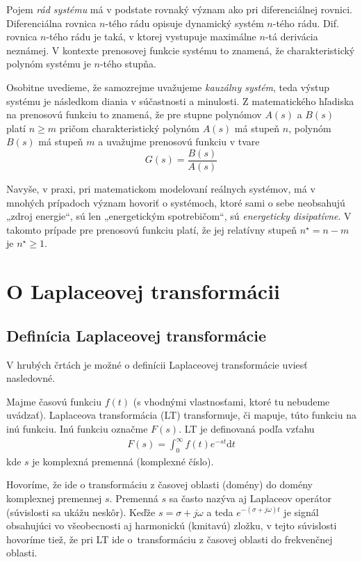 \documentclass[a4paper, 10pt, ]{article}
\begin{document}
Pojem \emph{rád systému} má v podstate rovnaký význam ako pri diferenciálnej rovnici. Diferenciálna rovnica $n$-tého rádu opisuje dynamický systém $n$-tého rádu. Dif. rovnica $n$-tého rádu je taká, v ktorej vystupuje maximálne $n$-tá derivácia neznámej. V kontexte prenosovej funkcie systému to znamená, že charakteristický polynóm systému je $n$-tého stupňa.

Osobitne uvedieme, že samozrejme uvažujeme \emph{kauzálny systém}, teda výstup systému je následkom diania v súčastnosti a minulosti. Z matematického hľadiska na prenosovú funkciu to znamená, že pre stupne polynómov $A(s)$ a $B(s)$ platí $n \geq m$ pričom charakteristický polynóm $A(s)$ má stupeň $n$, polynóm $B(s)$ má stupeň $m$ a uvažujme prenosovú funkciu v tvare
\begin{equation}
    G(s) = \frac{B(s)}{A(s)}
\end{equation}

Navyše, v praxi, pri matematickom modelovaní reálnych systémov, má v mnohých prípadoch význam hovoriť o systémoch, ktoré sami o sebe neobsahujú „zdroj energie“, sú len „energetickým spotrebičom“, sú \emph{energeticky disipatívne}. V takomto prípade pre prenosovú funkciu platí, že jej relatívny stupeň $n^\star = n-m$ je $n^\star \geq 1$.




\section{O Laplaceovej transformácii}


\subsection{Definícia Laplaceovej transformácie}

V hrubých črtách je možné o definícii Laplaceovej transformácie uviesť nasledovné.

Majme časovú funkciu $f(t)$ (s vhodnými vlastnosťami, ktoré tu nebudeme uvádzať). Laplaceova transformácia (LT) transformuje, či mapuje, túto funkciu na inú funkciu. Inú funkciu označme $F(s)$. LT je definovaná podľa vzťahu
\begin{align}
    F(s) = \int_0^\infty f(t) e^{-st}\text{d}t
\end{align}
kde $s$ je komplexná premenná (komplexné číslo).


Hovoríme, že ide o transformáciu z časovej oblasti (domény) do domény komplexnej premennej $s$. Premenná $s$ sa často nazýva aj Laplaceov operátor (súvislosti sa ukážu neskôr). Keďže $s = \sigma + j\omega$ a teda $e^{-(\sigma + j\omega)t}$ je signál obsahujúci vo všeobecnosti aj harmonickú (kmitavú) zložku, v tejto súvislosti hovoríme tiež, že pri LT ide o~transformáciu z časovej oblasti do frekvenčnej oblasti.
\end{document}
